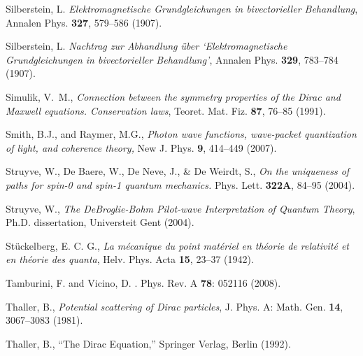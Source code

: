 \documentclass[11pt]{article}
\theoremstyle{definition}
\numberwithin{equation}{section}
\begin{document}
\begin{thebibliography}{[KTZ2020]}
        Silberstein, L.
       {\it Elektromagnetische Grundgleichungen in bivectorieller Behandlung},
       Annalen Phys. \textbf{327}, 579--586  (1907). \vspace{-4pt}

        Silberstein, L.
      {\it Nachtrag zur Abhandlung \"uber `Elektromagnetische Grundgleichungen in bivectorieller Behandlung'},
       Annalen Phys. \textbf{329}, 783--784 (1907). \vspace{-4pt}

        Simulik, V.~M.,
       \textit{Connection between the symmetry properties of the Dirac and Maxwell equations. Conservation laws},
       Teoret. Mat. Fiz. \textbf{87}, 76--85 (1991).\vspace{-4pt}

  Smith, B.J., 
  and 
  Raymer, M.G.,
  \textit{Photon wave functions, wave-packet quantization of light, and coherence theory,} 
  New J. Phys. \textbf{9}, 414--449 (2007). \vspace{-4pt} %

\! Struyve, W., De Baere, W., De Neve, J., \& De Weirdt, S.,
\textit{On the uniqueness of paths for spin-0 and spin-1 quantum mechanics.}
 Phys. Lett. \textbf{322A}, 84--95 (2004).\vspace{-4pt}

Struyve, W.,
\textit{The DeBroglie-Bohm Pilot-wave Interpretation of Quantum Theory},
Ph.D. dissertation, Universteit Gent (2004).

St\"uckelberg, E. C. G.,
  \textit{La m\'ecanique du point mat\'eriel en th\'eorie de relativit\'e et en th\'eorie des quanta},
  {Helv. Phys. Acta} \textbf{15}, {23--37} (1942).\vspace{-4pt}

 Tamburini, F. and Vicino, D.
 .
 \newblock Phys. Rev. A {\bf 78}: 052116 (2008).\vspace{-4pt}

Thaller, B.,
  \textit{Potential scattering of {D}irac particles},
  {J. Phys. A: Math. Gen.} \textbf{14}, 3067--3083 (1981).\vspace{-4pt}

  Thaller, B.,
  ``The Dirac Equation,''
  Springer Verlag, Berlin (1992).\vspace{-4pt}


\end{thebibliography}
\end{document}
